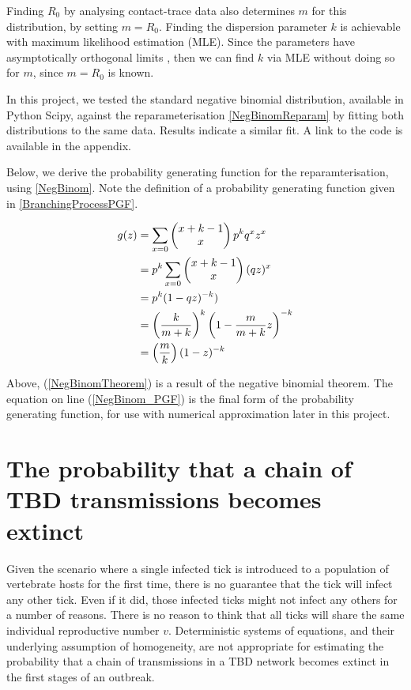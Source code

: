 \documentclass{article}
\begin{document}
Finding $ R_0 $ by analysing contact-trace data also determines $ m $ for this distribution, by setting $ m=R_0 $. Finding the dispersion parameter $ k $ is achievable with maximum likelihood estimation (MLE). Since the parameters have asymptotically orthogonal limits \cite{LloydSmith2005}, then we can find $ k $ via MLE without doing so for $ m $, since $ m=R_0 $ is known.

In this project, we tested the standard negative binomial distribution, available in Python Scipy, against the reparameterisation \eqref{NegBinomReparam} by fitting both distributions to the same data. Results indicate a similar fit. A link to the code is available in the appendix.

Below, we derive the probability generating function for the reparamterisation, using \eqref{NegBinom}. Note the definition of a probability generating function given in \eqref{BranchingProcessPGF}.

\begin{align}
	g(z) &= \sum_{x=0} \left(\begin{matrix}x+k-1 \\ x  \end{matrix}\right) \space p^k q^x z^x \nonumber \\ 
	     &= p^k \sum_{x=0} \left(\begin{matrix}x+k-1 \\ x \end{matrix}\right) \space (qz)^x \nonumber \\
	     &= p^k (1-qz)^{-k} \label{NegBinomTheorem}) \\
	     &= \left(\frac{k}{m+k}\right)^k \left(1-\frac{m}{m+k}z\right)^{-k} \nonumber \\ 
	     &= \left(\frac{m}{k}\right)(1-z)^{-k} \label{NegBinom_PGF}
\end{align}

Above, (\ref{NegBinomTheorem}) is a result of the negative binomial theorem. The equation on line (\ref{NegBinom_PGF}) is the final form of the probability generating function, for use with numerical approximation later in this project.

\newpage

\section{The probability that a chain of TBD transmissions becomes extinct}

Given the scenario where a single infected tick is introduced to a population of vertebrate hosts for the first time, there is no guarantee that the tick will infect any other tick. Even if it did, those infected ticks might not infect any others for a number of reasons. There is no reason to think that all ticks will share the same individual reproductive number $ v $. Deterministic systems of equations, and their underlying assumption of homogeneity, are not appropriate for estimating the probability that a chain of transmissions in a TBD network becomes extinct in the first stages of an outbreak.
\end{document}
